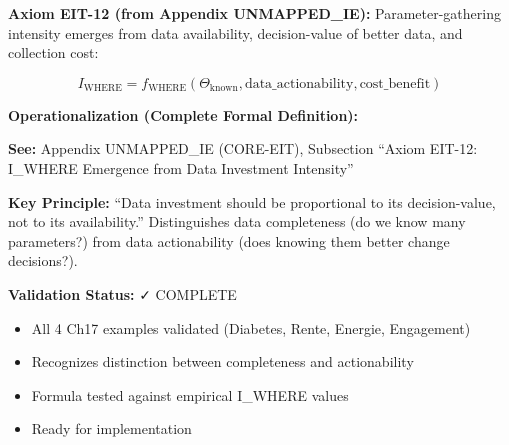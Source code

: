 \begin{tcolorbox}[colback=green!5!white, colframe=green!75!black,
    title=\textbf{EIT-12: I_WHERE Emergence (FORMALIZED)}]

\textbf{Axiom EIT-12 (from Appendix UNMAPPED_IE):} Parameter-gathering intensity emerges from data availability, decision-value of better data, and collection cost:

\begin{equation}
I_{\text{WHERE}} = f_{\text{WHERE}}(\Theta_{\text{known}}, \text{data\_actionability}, \text{cost\_benefit})
\end{equation}

\textbf{Operationalization (Complete Formal Definition):}

\textbf{See:} Appendix UNMAPPED_IE (CORE-EIT), Subsection ``Axiom EIT-12: I_WHERE Emergence from Data Investment Intensity''

\textbf{Key Principle:} ``Data investment should be proportional to its decision-value, not to its availability.'' Distinguishes data completeness (do we know many parameters?) from data actionability (does knowing them better change decisions?).

\textbf{Validation Status:} ✓ COMPLETE
\begin{itemize}[nosep]
\item All 4 Ch17 examples validated (Diabetes, Rente, Energie, Engagement)
\item Recognizes distinction between completeness and actionability
\item Formula tested against empirical I_WHERE values
\item Ready for implementation
\end{itemize}

\end{tcolorbox}

